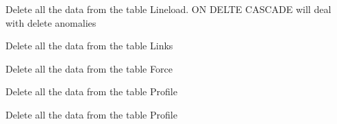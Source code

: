 \documentclass[letterpaper,10pt,english]{sphinxmanual}
\begin{document}
\begin{fulllineitems}
\begin{fulllineitems}
\label{\detokenize{api:beamon.database.Database.clear_lineloads}}
Delete all the data from the table Lineload. ON DELTE CASCADE will deal with delete anomalies

\end{fulllineitems}


\begin{fulllineitems}
\label{\detokenize{api:beamon.database.Database.clear_links}}
Delete all the data from the table Links

\end{fulllineitems}


\begin{fulllineitems}
\label{\detokenize{api:beamon.database.Database.clear_node_loads}}
Delete all the data from the table Force

\end{fulllineitems}


\begin{fulllineitems}
\label{\detokenize{api:beamon.database.Database.clear_nodes_table}}
Delete all the data from the table Profile

\end{fulllineitems}


\begin{fulllineitems}
\label{\detokenize{api:beamon.database.Database.clear_profile_table}}
Delete all the data from the table Profile


\end{fulllineitems}
\end{fulllineitems}
\end{document}
